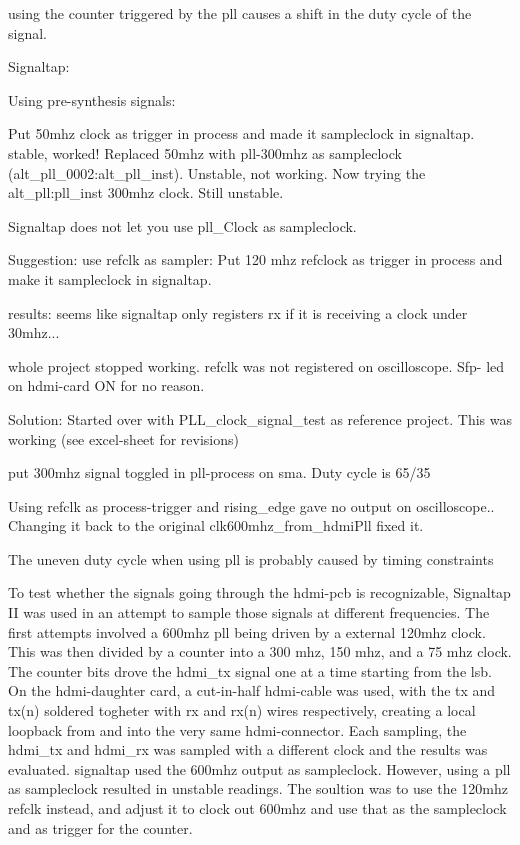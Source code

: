 \documentclass[main.tex]{subfiles}
\begin{document}
using the counter triggered by the pll causes a shift in the duty cycle of the signal.

Signaltap:

Using pre-synthesis signals:

Put 50mhz clock as trigger in process and made it sampleclock in signaltap. stable, worked!
Replaced 50mhz with pll-300mhz as sampleclock (alt\_pll\_0002:alt\_pll\_inst). Unstable, not working.
Now trying the alt\_pll:pll\_inst 300mhz clock. Still unstable.

Signaltap does not let you use pll\_Clock as sampleclock.

Suggestion: use refclk as sampler: Put 120 mhz refclock as trigger in process and make it sampleclock in signaltap.

results: seems like signaltap only registers rx if it is receiving a clock under 30mhz...

whole project stopped working. refclk was not registered on oscilloscope. Sfp- led on hdmi-card ON for no reason.

Solution: Started over with PLL\_clock\_signal\_test as reference project. This was working (see excel-sheet for revisions)

put 300mhz signal toggled in pll-process on sma. Duty cycle is 65/35 %

Using refclk as process-trigger and rising\_edge gave no output on oscilloscope..
Changing it back to the original clk600mhz\_from\_hdmiPll fixed it. 

The uneven duty cycle when using pll is probably caused by timing constraints

To test whether the signals going through the hdmi-pcb is recognizable, Signaltap II was used in an attempt to sample those signals at different frequencies. The first attempts involved a 600mhz pll being driven by a external 120mhz clock. This was then divided by a counter into a 300 mhz, 150 mhz, and a 75 mhz clock. The counter bits drove the hdmi\_tx signal one at a time starting from the lsb. On the hdmi-daughter card, a cut-in-half hdmi-cable was used, with the tx and tx(n) soldered togheter with rx and rx(n) wires respectively, creating a local loopback from and into the very same hdmi-connector. Each sampling, the hdmi\_tx and hdmi\_rx was sampled with a different clock and the results was evaluated. signaltap used the 600mhz output as sampleclock. However, using a pll as sampleclock resulted in unstable readings. The soultion was to use  the 120mhz refclk instead, and adjust it to clock out 600mhz and use that as the sampleclock and as trigger for the counter. 
\end{document}
